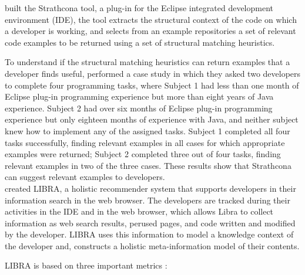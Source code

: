 \documentclass[12pt,mscthesis]{usiinfthesis}
\begin{document}
	\citet{Holmes:2005:USC:1062455.1062491}  built the Strathcona tool, a plug-in for the Eclipse integrated development environment (IDE), the tool extracts the structural context of the code on which a developer is working, and selects from an example repositories a set of relevant code examples to be returned using a set of structural matching heuristics.


	To understand if the structural matching heuristics can return examples that a developer finds useful, \citet{Holmes:2005:USC:1062455.1062491} performed a case study in which they asked two developers to complete four programming tasks, where Subject 1 had less than one month of Eclipse plug-in programming experience but more than eight years of Java experience. Subject 2 had over six months of Eclipse plug-in programming experience but only eighteen months of experience with Java, and neither subject knew how to implement any of the assigned tasks.
	Subject 1 completed all four tasks successfully, finding relevant examples in all cases for which appropriate examples were returned; Subject 2 completed three out of four tasks, finding relevant examples in two of the three cases. These results show that Strathcona can suggest relevant examples to developers.\\

	\citet{Ponz2017a} created LIBRA, a holistic recommender system that supports developers in their information search in the web browser. The developers are tracked during their activities in the IDE and in the web browser, which allows Libra to collect information as web search results, perused pages, and code written and modified by the developer. LIBRA uses this information to model a knowledge context of the developer and, constructs a holistic meta-information model of their contents.
	

	LIBRA is based on three important metrics :
	
\end{document}
